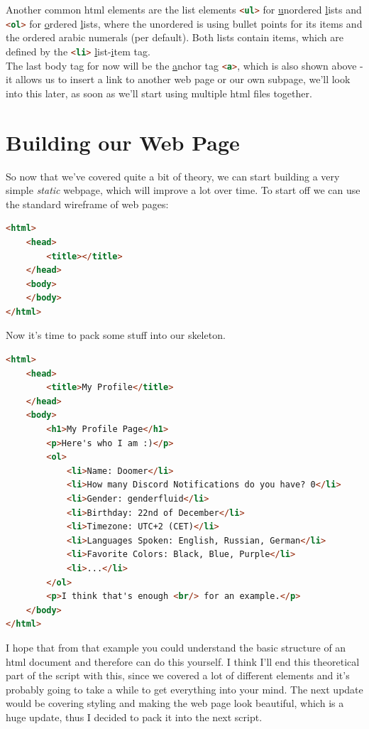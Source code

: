 \documentclass[a4paper,12pt]{article}
\newcommand{\htmlelem}[1]{\lstinline[columns=fixed,language=HTML]{#1}}
\newcommand{\nsp}{\vspace{0.05cm}\\}
\begin{document}
Another common html elements are the list elements \htmlelem{<ul>} for \underline{u}nordered \underline{l}ists and \htmlelem{<ol>} for \underline{o}rdered \underline{l}ists, where the unordered is using bullet points for its items and the ordered arabic numerals (per default). Both lists contain items, which are defined by the \htmlelem{<li>} \underline{l}ist-\underline{i}tem tag.\nsp
The last body tag for now will be the \underline{a}nchor tag \htmlelem{<a>}, which is also shown above - it allows us to insert a link to another web page or our own subpage, we'll look into this later, as soon as we'll start using multiple html files together.
\section{Building our Web Page}
So now that we've covered quite a bit of theory, we can start building a very simple \textit{static} webpage, which will improve a lot over time. To start off we can use the standard wireframe of web pages:
\begin{lstlisting}[language=HTML,caption=Our HTML Wireframe,label={lst:html_wireframe}]
<html>
    <head>
        <title></title>
    </head>
    <body>
    </body>
</html>
\end{lstlisting}
Now it's time to pack some stuff into our skeleton.
\begin{lstlisting}[language=HTML,caption=Content Update,label={lst:html_wireframe_1}]
<html>
    <head>
        <title>My Profile</title>
    </head>
    <body>
        <h1>My Profile Page</h1>
        <p>Here's who I am :)</p>
        <ol>
            <li>Name: Doomer</li>
            <li>How many Discord Notifications do you have? 0</li>
            <li>Gender: genderfluid</li>
            <li>Birthday: 22nd of December</li>
            <li>Timezone: UTC+2 (CET)</li>
            <li>Languages Spoken: English, Russian, German</li>
            <li>Favorite Colors: Black, Blue, Purple</li>
            <li>...</li>
        </ol>
        <p>I think that's enough <br/> for an example.</p>
    </body>
</html>
\end{lstlisting}
I hope that from that example you could understand the basic structure of an html document and therefore can do this yourself. I think I'll end this theoretical part of the script with this, since we covered a lot of different elements and it's probably going to take a while to get everything into your mind. The next update would be covering styling and making the web page look beautiful, which is a huge update, thus I decided to pack it into the next script.
\end{document}
